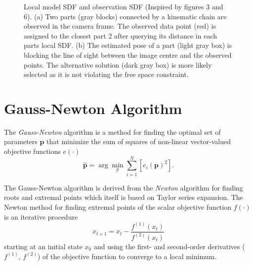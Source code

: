 \begin{figure}
\centering
{}
\caption[Signed Distance Function]{Local model SDF and observation SDF (Inspired by \cite{Schmidt2015} figures 3 and 6). (a) Two parts (gray blocks) connected by a kinematic chain are observed in the camera frame. The observed data point (red) is assigned to the closest part 2 after querying its distance in each parts local SDF. (b) The estimated pose of a part (light gray box) is blocking the line of sight between the image centre and the observed points. The alternative solution (dark gray box) is more likely selected as it is not violating the free space constraint.}
\end{figure}

\section{Gauss-Newton Algorithm}

The \textit{Gauss-Newton} algorithm is a method for finding the optimal set of parameters $\mathbf{p}$ that minimize the sum of squares of non-linear vector-valued objective functions $e(\cdot)$
%
\begin{equation}
\hat{\mathbf{p}} = \arg\min_{p} \sum_{i=1}^N\left[ e_i(\mathbf{p})^2\right] .
\end{equation}

The Gauss-Newton algorithm is derived from the \textit{Newton} algorithm for finding roots and extremal points which itself is based on Taylor series expansion. The Newton method for finding extremal points of the scalar objective function $f(\cdot)$ is an iterative procedure
%
\begin{equation}
x_{t+1} = x_t - \frac{f^{(1)}(x_t)}{f^{(2)}(x_t)}
\label{eqn:newton_minimum}
\end{equation}
%
starting at an initial state $x_0$ and using the first- and second-order derivatives ($f^{(1)}$, $f^{(2)}$) of the objective function to converge to a local minimum.

